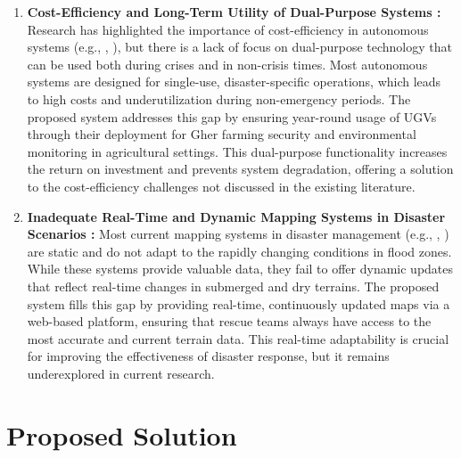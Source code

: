 \documentclass[conference]{IEEEtran}
\begin{document}
\begin{enumerate}
	
	\item \textbf{Cost-Efficiency and Long-Term Utility of Dual-Purpose Systems : }
	Research has highlighted the importance of cost-efficiency in autonomous systems (e.g., \cite{ref23}, \cite{ref24}), but there is a lack of focus on dual-purpose technology that can be used both during crises and in non-crisis times. Most autonomous systems are designed for single-use, disaster-specific operations, which leads to high costs and underutilization during non-emergency periods. The proposed system addresses this gap by ensuring year-round usage of UGVs through their deployment for Gher farming security and environmental monitoring in agricultural settings. This dual-purpose functionality increases the return on investment and prevents system degradation, offering a solution to the cost-efficiency challenges not discussed in the existing literature.
	
	\item \textbf{Inadequate Real-Time and Dynamic Mapping Systems in Disaster Scenarios : }
Most current mapping systems in disaster management (e.g., \cite{ref17}, \cite{ref18}) are static and do not adapt to the rapidly changing conditions in flood zones. While these systems provide valuable data, they fail to offer dynamic updates that reflect real-time changes in submerged and dry terrains. The proposed system fills this gap by providing real-time, continuously updated maps via a web-based platform, ensuring that rescue teams always have access to the most accurate and current terrain data. This real-time adaptability is crucial for improving the effectiveness of disaster response, but it remains underexplored in current research.
		
\end{enumerate}	


\section{\textbf{Proposed Solution}}
\end{document}
